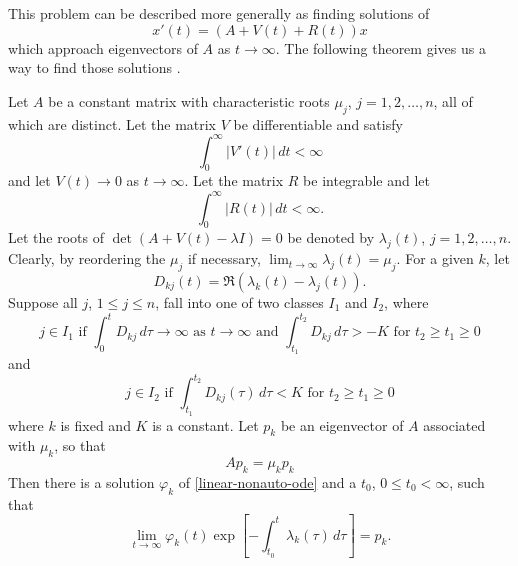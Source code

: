 This problem can be described more generally as finding solutions of 
\begin{equation}\label{linear-nonauto-ode}
	x'(t) = (A+ V(t) + R(t))x
\end{equation}
which approach eigenvectors of \(A\) as \(t\to \infty\). The following theorem gives us a way to find those solutions \cite[Chp.~3, Thm.~8.1]{coddington1955theory}.
\begin{theorem}\label{thm:coddington}
	Let \(A\) be a constant matrix with characteristic roots \(\mu_j\), \(j=1,2,\ldots, n\), all of which are distinct. Let the matrix \(V\) be differentiable and satisfy
	\begin{equation}
		\int_0^\infty |V'(t)|\, dt < \infty
	\end{equation}
	and let \(V(t) \to 0\) as \(t\to\infty\). Let the matrix \(R\) be integrable and let 
	\begin{equation}
		\int_0^\infty |R(t)|\, dt < \infty.
	\end{equation}
	Let the roots of \(\det(A+V(t) -\lambda I) = 0\) be denoted by \(\lambda_j(t)\), \(j = 1,2 ,\ldots, n\). Clearly, by reordering the \(\mu_j\) if necessary, \(\lim_{t\to\infty} \lambda_j(t) = \mu_j\). For a given \(k\), let 
	\begin{equation}
		D_{kj}(t) = \Re(\lambda_k(t) - \lambda_j(t)).
	\end{equation}
	Suppose all \(j\), \(1\leq j \leq n\), fall into one of two classes \(I_1\) and \(I_2\), where
	\begin{equation}
		j \in I_1 \text{ if } \int_0^t D_{kj}\, d\tau \to \infty \text{ as } t\to\infty \text{ and } \int_{t_1}^{t_2} D_{kj}\, d\tau > -K \text{ for }t_2\geq t_1 \geq 0
	\end{equation}
	and 
	\begin{equation}
		j \in I_2 \text{ if } \int_{t_1}^{t_2} D_{kj}(\tau) \, d\tau  < K \text{ for } t_2\geq t_1\geq 0
	\end{equation}
	where \(k\) is fixed and \(K\) is a constant. Let \(p_k\) be an eigenvector of \(A\) associated with \(\mu_k\), so that 
	\begin{equation}
		Ap_k = \mu_k p_k
	\end{equation}
	Then there is a solution \(\varphi_k\) of \cref{linear-nonauto-ode} and a \(t_0\), \(0\leq t_0< \infty\), such that
	\begin{equation}
		\lim_{t\to\infty} \varphi_k(t) \exp\left[ - \int_{t_0}^ t \lambda_k(\tau) \, d\tau \right] = p_k.
	\end{equation}
\end{theorem}

